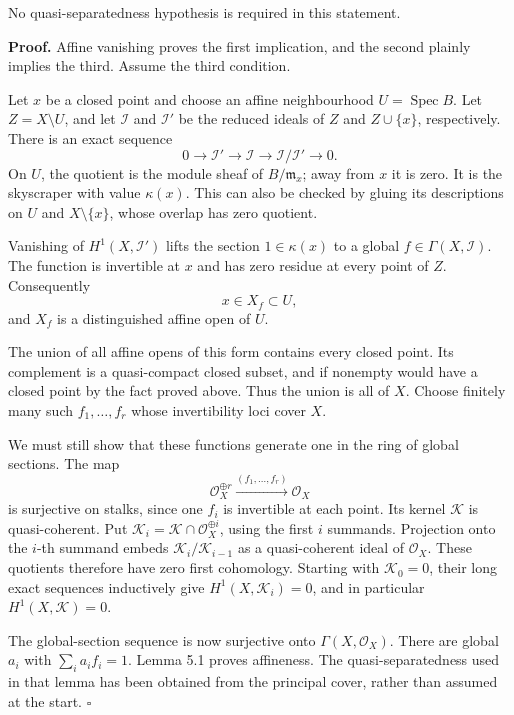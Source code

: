 \documentclass[11pt]{article}
\begin{document}
No quasi-separatedness hypothesis is required in this statement.

\textbf{Proof.} Affine vanishing proves the first implication, and the
second plainly implies the third. Assume the third condition.

Let \(x\) be a closed point and choose an affine neighbourhood
\(U=\operatorname{Spec}B\). Let \(Z=X\setminus U\), and let
\(\mathcal I\) and \(\mathcal I'\) be the reduced ideals of \(Z\) and
\(Z\cup\{x\}\), respectively. There is an exact sequence \[
0\to\mathcal I'\to\mathcal I\to\mathcal I/\mathcal I'\to0.
\] On \(U\), the quotient is the module sheaf of \(B/\mathfrak m_x\);
away from \(x\) it is zero. It is the skyscraper with value
\(\kappa(x)\). This can also be checked by gluing its descriptions on
\(U\) and \(X\setminus\{x\}\), whose overlap has zero quotient.

Vanishing of \(H^1(X,\mathcal I')\) lifts the section \(1\in\kappa(x)\)
to a global \(f\in\Gamma(X,\mathcal I)\). The function is invertible at
\(x\) and has zero residue at every point of \(Z\). Consequently \[
x\in X_f\subset U,
\] and \(X_f\) is a distinguished affine open of \(U\).

The union of all affine opens of this form contains every closed point.
Its complement is a quasi-compact closed subset, and if nonempty would
have a closed point by the fact proved above. Thus the union is all of
\(X\). Choose finitely many such \(f_1,\ldots,f_r\) whose invertibility
loci cover \(X\).

We must still show that these functions generate one in the ring of
global sections. The map \[
\mathcal O_X^{\oplus r}\xrightarrow{(f_1,\ldots,f_r)}\mathcal O_X
\] is surjective on stalks, since one \(f_i\) is invertible at each
point. Its kernel \(\mathcal K\) is quasi-coherent. Put
\(\mathcal K_i=\mathcal K\cap\mathcal O_X^{\oplus i}\), using the first
\(i\) summands. Projection onto the \(i\)-th summand embeds
\(\mathcal K_i/\mathcal K_{i-1}\) as a quasi-coherent ideal of
\(\mathcal O_X\). These quotients therefore have zero first cohomology.
Starting with \(\mathcal K_0=0\), their long exact sequences inductively
give \(H^1(X,\mathcal K_i)=0\), and in particular
\(H^1(X,\mathcal K)=0\).

The global-section sequence is now surjective onto
\(\Gamma(X,\mathcal O_X)\). There are global \(a_i\) with
\(\sum_i a_i f_i=1\). Lemma 5.1 proves affineness. The
quasi-separatedness used in that lemma has been obtained from the
principal cover, rather than assumed at the start. \(\square\)
\end{document}
